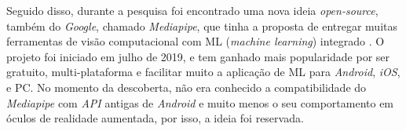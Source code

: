 Seguido disso, durante a pesquisa foi encontrado uma nova ideia \textit{open-source}, também do \textit{Google}, chamado \textit{Mediapipe}, que tinha a proposta de entregar muitas ferramentas de visão computacional com ML (\textit{machine learning}) integrado \cite{mediapipe-docs}. O projeto foi iniciado em julho de 2019, e tem ganhado mais popularidade por ser gratuito, multi-plataforma e facilitar muito a aplicação de ML para \textit{Android}, \textit{iOS}, e PC. No momento da descoberta, não era conhecido a compatibilidade do \textit{Mediapipe} com \textit{API} antigas de \textit{Android} e muito menos o seu comportamento em óculos de realidade aumentada, por isso, a ideia foi reservada.


